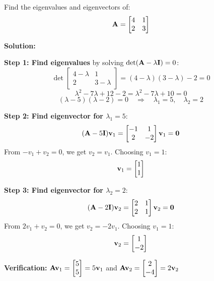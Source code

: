 \begin{examplebox}[title=Example: Eigenvalues and Eigenvectors of a 2x2 Matrix]
Find the eigenvalues and eigenvectors of:
\[
\mathbf{A} = \begin{bmatrix} 4 & 1 \\ 2 & 3 \end{bmatrix}
\]

\textbf{Solution:}

\textbf{Step 1: Find eigenvalues} by solving $\det(\mathbf{A} - \lambda\mathbf{I}) = 0$:
\[
\det\begin{bmatrix} 4-\lambda & 1 \\ 2 & 3-\lambda \end{bmatrix} = (4-\lambda)(3-\lambda) - 2 = 0
\]
\[
\lambda^2 - 7\lambda + 12 - 2 = \lambda^2 - 7\lambda + 10 = 0
\]
\[
(\lambda - 5)(\lambda - 2) = 0 \quad \Rightarrow \quad \lambda_1 = 5, \quad \lambda_2 = 2
\]

\textbf{Step 2: Find eigenvector for $\lambda_1 = 5$}:
\[
(\mathbf{A} - 5\mathbf{I})\mathbf{v}_1 = \begin{bmatrix} -1 & 1 \\ 2 & -2 \end{bmatrix}\mathbf{v}_1 = \mathbf{0}
\]
From $-v_1 + v_2 = 0$, we get $v_2 = v_1$. Choosing $v_1 = 1$:
\[
\mathbf{v}_1 = \begin{bmatrix} 1 \\ 1 \end{bmatrix}
\]

\textbf{Step 3: Find eigenvector for $\lambda_2 = 2$}:
\[
(\mathbf{A} - 2\mathbf{I})\mathbf{v}_2 = \begin{bmatrix} 2 & 1 \\ 2 & 1 \end{bmatrix}\mathbf{v}_2 = \mathbf{0}
\]
From $2v_1 + v_2 = 0$, we get $v_2 = -2v_1$. Choosing $v_1 = 1$:
\[
\mathbf{v}_2 = \begin{bmatrix} 1 \\ -2 \end{bmatrix}
\]

\textbf{Verification:} $\mathbf{A}\mathbf{v}_1 = \begin{bmatrix} 5 \\ 5 \end{bmatrix} = 5\mathbf{v}_1$ \checkmark \quad and \quad $\mathbf{A}\mathbf{v}_2 = \begin{bmatrix} 2 \\ -4 \end{bmatrix} = 2\mathbf{v}_2$ \checkmark
\end{examplebox}

